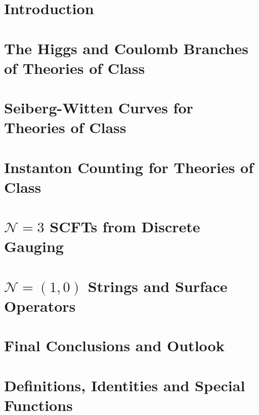 \documentclass[a4paper,11pt]{book}
\begin{document}


	\chapter{Introduction}
	\label{Chap:intro}
		
	
	\chapter{The Higgs and Coulomb Branches of Theories of Class \texorpdfstring{\protect\Sk}{Sk}}
	\label{Chap:HCSk}
	
	
	\chapter{Seiberg-Witten Curves for Theories of Class \texorpdfstring{\protect\Sk}{Sk}}
	\label{Chap:SkCurves}
	
		
	\chapter{Instanton Counting for Theories of Class \texorpdfstring{\protect\Sk}{Sk}}
	\label{Chap:skinstcounting}
	
	
	\chapter{\texorpdfstring{$\mathcal{N}=3$}{N=3} SCFTs from Discrete Gauging}
	\label{Chap:N3DG}
	
	
	\chapter{\texorpdfstring{$\mathcal{N}=(1,0)$}{N=(1,0)} Strings and Surface Operators}
	\label{Chap:10Defects}
	
	
	\chapter{Final Conclusions and Outlook}
	\label{Chap:Conclusions}
	
	
\appendix
\allowdisplaybreaks

	\chapter{Definitions, Identities and Special Functions}
	\label{Chap:AppIdentities}
	
	
\end{document}
